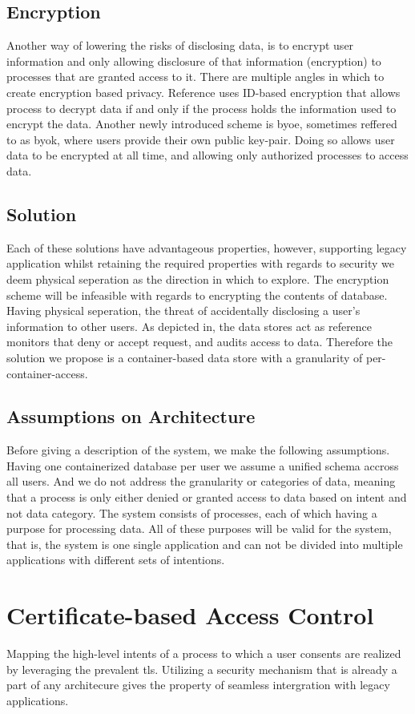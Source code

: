 \documentclass[USenglish]{uit-thesis}
\begin{document}
\subsection{Encryption}
Another way of lowering the risks of disclosing data, is to encrypt user information
and only allowing disclosure of that information (encryption) to processes that
are granted access to it.
There are multiple angles in which to create encryption based privacy.
Reference uses ID-based encryption that allows process to decrypt data if and only if
the process holds the information used to encrypt the data.
Another newly introduced scheme is \gls{byoe}, sometimes reffered to as \gls{byok},
where users provide their own public key-pair.
Doing so allows user data to be encrypted at all time, and allowing only authorized
processes to access data.

\subsection{Solution}
Each of these solutions have advantageous properties, however, supporting
legacy application whilst retaining the required properties with regards to security we deem
physical seperation as the direction in which to explore.
The encryption scheme will be infeasible with regards to encrypting the contents of database.
Having physical seperation, the threat of accidentally disclosing a user's information
to other users.
As depicted in, the data stores act as reference monitors that deny or accept request, and
audits access to data.
Therefore the solution we propose is a container-based data store with a granularity
of per-container-access.

\subsection{Assumptions on Architecture}
Before giving a description of the system, we make the following assumptions.
Having one containerized database per user we assume a unified schema accross
all users.
And we do not address the granularity or categories of data, meaning that
a process is only either denied or granted access to data based on intent and not data category.
The system consists of processes, each of which having a purpose for processing data.
All of these purposes will be valid for the system, that is,
the system is one single application and can not be divided into multiple applications
with different sets of intentions.

\section{Certificate-based Access Control}
Mapping the high-level intents of a process to which a user consents are realized by
leveraging the prevalent \gls{tls}.
Utilizing a security mechanism that is already a part of any architecure gives
the property of seamless intergration with legacy applications.
\end{document}
